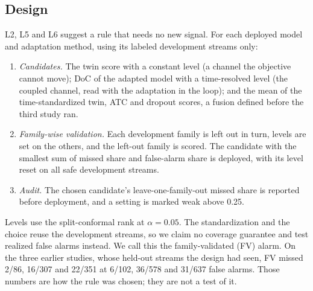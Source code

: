 \documentclass[runningheads]{llncs}
\begin{document}
\subsection{Design}
L2, L5 and L6 suggest a rule that needs no new signal. For each deployed model and adaptation method, using its labeled development streams only:
\begin{enumerate}
\item \emph{Candidates.} The twin score with a constant level (a channel the objective cannot move); DoC of the adapted model with a time-resolved level (the coupled channel, read with the adaptation in the loop); and the mean of the time-standardized twin, ATC and dropout scores, a fusion defined before the third study ran.
\item \emph{Family-wise validation.} Each development family is left out in turn, levels are set on the others, and the left-out family is scored. The candidate with the smallest sum of missed share and false-alarm share is deployed, with its level reset on all safe development streams.
\item \emph{Audit.} The chosen candidate's leave-one-family-out missed share is reported before deployment, and a setting is marked weak above 0.25.
\end{enumerate}
Levels use the split-conformal rank at $\alpha=0.05$. The standardization and the choice reuse the development streams, so we claim no coverage guarantee and test realized false alarms instead. We call this the family-validated (FV) alarm. On the three earlier studies, whose held-out streams the design had seen, FV missed 2/86, 16/307 and 22/351 at 6/102, 36/578 and 31/637 false alarms. Those numbers are how the rule was chosen; they are not a test of it.
\end{document}
